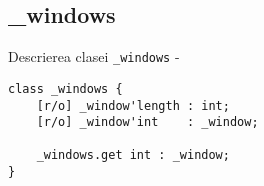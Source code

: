 \subsection{{\color{orange} \_windows}}

\noindent Descrierea clasei \texttt{\_windows} -
\begin{verbatim}
class _windows {
	[r/o] _window'length : int;
	[r/o] _window'int    : _window;
	
	_windows.get int : _window;
}
\end{verbatim}


